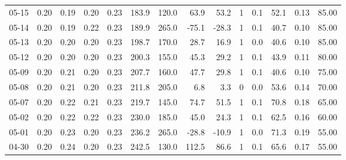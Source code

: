 \begin{threeparttable}
{\begin{tabular}{lrrrrrrrrrrrrr}
  05-15 &          0.20 &          0.19 &          0.20 &        0.23 &               183.9 &               120.0 &       63.9 &         53.2 &              1 &                 0.1 &             52.1 &            0.13 &                  85.00 \\
  05-14 &          0.20 &          0.19 &          0.22 &        0.23 &               189.9 &               265.0 &      -75.1 &        -28.3 &              1 &                 0.1 &             40.7 &            0.10 &                  85.00 \\
  05-13 &          0.20 &          0.20 &          0.20 &        0.23 &               198.7 &               170.0 &       28.7 &         16.9 &              1 &                 0.0 &             40.6 &            0.10 &                  85.00 \\
  05-12 &          0.20 &          0.20 &          0.20 &        0.23 &               200.3 &               155.0 &       45.3 &         29.2 &              1 &                 0.1 &             43.9 &            0.11 &                  80.00 \\
  05-09 &          0.20 &          0.21 &          0.20 &        0.23 &               207.7 &               160.0 &       47.7 &         29.8 &              1 &                 0.1 &             40.6 &            0.10 &                  75.00 \\
  05-08 &          0.20 &          0.21 &          0.20 &        0.23 &               211.8 &               205.0 &        6.8 &          3.3 &              0 &                 0.0 &             53.6 &            0.14 &                  70.00 \\
  05-07 &          0.20 &          0.22 &          0.21 &        0.23 &               219.7 &               145.0 &       74.7 &         51.5 &              1 &                 0.1 &             70.8 &            0.18 &                  65.00 \\
  05-02 &          0.20 &          0.22 &          0.22 &        0.23 &               230.0 &               185.0 &       45.0 &         24.3 &              1 &                 0.1 &             62.5 &            0.16 &                  60.00 \\
  05-01 &          0.20 &          0.23 &          0.20 &        0.23 &               236.2 &               265.0 &      -28.8 &        -10.9 &              1 &                 0.0 &             71.3 &            0.19 &                  55.00 \\
  04-30 &          0.20 &          0.24 &          0.20 &        0.23 &               242.5 &               130.0 &      112.5 &         86.6 &              1 &                 0.1 &             65.6 &            0.17 &                  55.00 \\

\end{tabular}}
\end{threeparttable}
